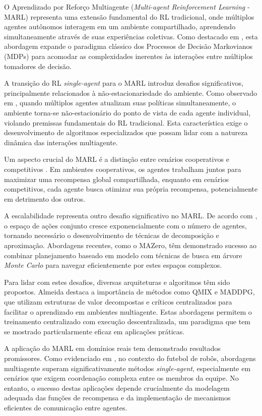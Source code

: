 O Aprendizado por Reforço Multiagente (\textit{Multi-agent Reinforcement Learning} - MARL) representa uma extensão fundamental do RL tradicional, onde múltiplos agentes autônomos interagem em um ambiente compartilhado, aprendendo simultaneamente através de suas experiências coletivas. Como destacado em \cite{bruno_brandao}, esta abordagem expande o paradigma clássico dos Processos de Decisão Markovianos (MDPs) para acomodar as complexidades inerentes às interações entre múltiplos tomadores de decisão.

A transição do RL \textit{single-agent} para o MARL introduz desafios significativos, principalmente relacionados à não-estacionariedade do ambiente. Como observado em \cite{seac_multiagent}, quando múltiplos agentes atualizam suas políticas simultaneamente, o ambiente torna-se não-estacionário do ponto de vista de cada agente individual, violando premissas fundamentais do RL tradicional. Esta característica exige o desenvolvimento de algoritmos especializados que possam lidar com a natureza dinâmica das interações multiagente.

Um aspecto crucial do MARL é a distinção entre cenários cooperativos e competitivos \cite{review_cooperative_multi_agent}. Em ambientes cooperativos, os agentes trabalham juntos para maximizar uma recompensa global compartilhada, enquanto em cenários competitivos, cada agente busca otimizar sua própria recompensa, potencialmente em detrimento dos outros.

A escalabilidade representa outro desafio significativo no MARL. De acordo com \cite{efficient_multi_agent}, o espaço de ações conjunto cresce exponencialmente com o número de agentes, tornando necessário o desenvolvimento de técnicas de decomposição e aproximação. Abordagens recentes, como o MAZero, têm demonstrado sucesso ao combinar planejamento baseado em modelo com técnicas de busca em árvore \textit{Monte Carlo} para navegar eficientemente por estes espaços complexos.

Para lidar com estes desafios, diversas arquiteturas e algoritmos têm sido propostos. Almeida \cite{agentes_inteligentes_puc} destaca a importância de métodos como QMIX e MADDPG, que utilizam estruturas de valor decompostas e críticos centralizados para facilitar o aprendizado em ambientes multiagente. Estas abordagens permitem o treinamento centralizado com execução descentralizada, um paradigma que tem se mostrado particularmente eficaz em aplicações práticas.

A aplicação do MARL em domínios reais tem demonstrado resultados promissores. Como evidenciado em \cite{martins_vss}, no contexto do futebol de robôs, abordagens multiagente superam significativamente métodos \textit{single-agent}, especialmente em cenários que exigem coordenação complexa entre os membros da equipe. No entanto, o sucesso destas aplicações depende crucialmente da modelagem adequada das funções de recompensa e da implementação de mecanismos eficientes de comunicação entre agentes.

